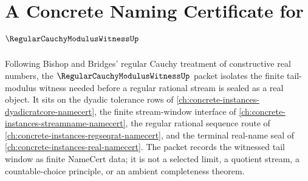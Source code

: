 \chapter{A Concrete Naming Certificate for $\RegularCauchyModulusWitnessUp$}
\label{ch:concrete-instances-regular-cauchy-modulus-witness-namecert}

Following Bishop and Bridges' regular Cauchy treatment of constructive real numbers, the $\RegularCauchyModulusWitnessUp$ packet isolates the finite tail-modulus witness needed before a regular rational stream is sealed as a real object. It sits on the dyadic tolerance rows of \autoref{ch:concrete-instances-dyadicratcore-namecert}, the finite stream-window interface of \autoref{ch:concrete-instances-streamname-namecert}, the regular rational sequence route of \autoref{ch:concrete-instances-regseqrat-namecert}, and the terminal real-name seal of \autoref{ch:concrete-instances-real-namecert}. The packet records the witnessed tail window as finite NameCert data; it is not a selected limit, a quotient stream, a countable-choice principle, or an ambient completeness theorem.


